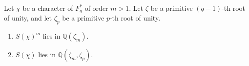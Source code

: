 Let $\chi$ be a character of $F_q^*$ of order $m > 1$. Let $\zeta$ be a primitive $(q-1)$-th root of unity, and let $\zeta_p$ be a primitive $p$-th root of unity.

\begin{enumerate}
\item $S(\chi)^m$ lies in $\mathbb{Q}(\zeta_m)$.
\item $S(\chi)$ lies in $\mathbb{Q}(\zeta_m, \zeta_p)$.
\end{enumerate}
